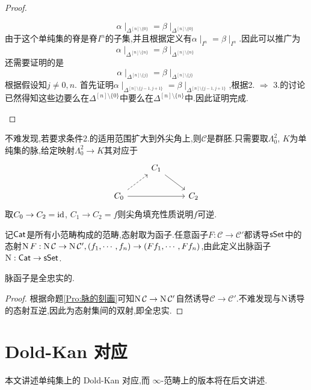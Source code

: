 \begin{proof}
\begin{enumerate}
    \[
    \alpha\mid_{\Delta^{[n]\setminus\{0\}}} = \beta\mid_{\Delta^{[n]\setminus\{0\}}}
    \]
    由于这个单纯集的脊是脊$I^n$的子集,并且根据定义有$\alpha \mid_{I^n} = \beta\mid_{I^n}$.因此可以推广为
    \[
    \alpha\mid_{\Delta^{[n]\setminus\{n\}}} = \beta\mid_{\Delta^{[n]\setminus\{n\}}}
    \]
    还需要证明的是
    \[
    \alpha\mid_{\Delta^{[n]\setminus\{j\}}} = \beta\mid_{\Delta^{[n]\setminus\{j\}}}
    \]
    根据假设知$j \neq 0,n$. 首先证明$\alpha\mid_{\Delta^{[n]\setminus\{j-1,j+1\}}} = \beta\mid_{\Delta^{[n]\setminus\{j-1,j+1\}}}$,根据2. $\Rightarrow$ 3.的讨论已然得知这些边要么在$\Delta^{[n]\setminus \{0\}}$中要么在$\Delta^{[n]\setminus \{n\}}$中.因此证明完成.
    \end{enumerate}
\end{proof}
\begin{remark}\label{Rk:外尖角可填充为群胚}
    不难发现,若要求条件2.的适用范围扩大到外尖角上,则$\mathcal{C}$是群胚.只需要取$\Lambda_0^2$, $K$为单纯集的脉,给定映射$\Lambda_0^2 \to K$其对应于
    \[\begin{tikzcd}
	& {C_1} \\
	{C_0} && {C_2}
	\arrow[from=1-2, to=2-3]
	\arrow[dashed, from=2-1, to=1-2]
	\arrow[from=2-1, to=2-3]
    \end{tikzcd}\]
    取$C_0 \to C_2 = \mathrm{id}$, $C_1 \to C_2 = f$则尖角填充性质说明$f$可逆.
\end{remark}

记$\mathsf{Cat}$是所有小范畴构成的范畴,态射取为函子.任意函子$F : \mathcal{C} \to \mathcal{C}'$都诱导$\mathsf{sSet}$中的态射$\operatorname{N} F : \operatorname{N} \mathcal{C} \to \operatorname{N} \mathcal{C}' , (f_1,\cdots,f_n) \to (Ff_1,\cdots,Ff_n)$,由此定义出脉函子$\operatorname{N} : \mathsf{Cat} \to \mathsf{sSet}$.
\begin{corollary}
    脉函子是全忠实的.
\end{corollary}
\begin{proof}
    根据命题\ref{Pro:脉的刻画}可知$\operatorname{N} \mathcal{C} \to \operatorname{N} \mathcal{C}'$自然诱导$\mathcal{C}\to \mathcal{C}'$.不难发现与$\operatorname{N}$诱导的态射互逆,因此为态射集间的双射,即全忠实.
\end{proof}
\section{Dold-Kan 对应}\label{Dold-Kan 对应}
\begin{wenxintishi}
    本文讲述单纯集上的 Dold-Kan 对应,而 $\infty$-范畴上的版本将在后文讲述.
\end{wenxintishi}

